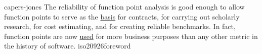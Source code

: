 \documentclass{article}
\begin{document}

\qte
  {capers-jones}
  {The reliability of function point analysis is good enough to allow function points to serve as the \ul{basis} for contracts, for carrying out scholarly research, for cost estimating, and for creating reliable benchmarks. In fact, function points are now \ul{used} for more business purposes than any other metric in the history of software.}
  {iso20926foreword}

\end{document}
